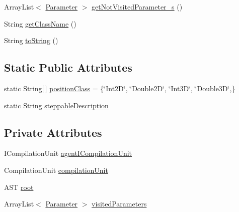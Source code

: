 \begin{DoxyCompactItemize}
\item 
Array\-List$<$ \hyperlink{classit_1_1isislab_1_1masonhelperdocumentation_1_1analizer_1_1_parameter}{Parameter} $>$ \hyperlink{classit_1_1isislab_1_1masonhelperdocumentation_1_1analizer_1_1_agent_analizer_a9fdb36c2a505d7ad2459d70f413216d0}{get\-Not\-Visited\-Parameter\-\_\-s} ()
\item 
String \hyperlink{classit_1_1isislab_1_1masonhelperdocumentation_1_1analizer_1_1_agent_analizer_ace466e16439878a851eb63d5a11ddf43}{get\-Class\-Name} ()
\item 
String \hyperlink{classit_1_1isislab_1_1masonhelperdocumentation_1_1analizer_1_1_agent_analizer_aea58a6f4ec614b3778588784cb250dcb}{to\-String} ()
\end{DoxyCompactItemize}
\subsection*{Static Public Attributes}
\begin{DoxyCompactItemize}
\item 
static String\mbox{[}$\,$\mbox{]} \hyperlink{classit_1_1isislab_1_1masonhelperdocumentation_1_1analizer_1_1_agent_analizer_a9d8e56c5d7ee2102e06e509b301205bb}{position\-Class} = \{\char`\"{}Int2\-D\char`\"{}, \char`\"{}Double2\-D\char`\"{}, \char`\"{}Int3\-D\char`\"{}, \char`\"{}Double3\-D\char`\"{},\}
\item 
static String \hyperlink{classit_1_1isislab_1_1masonhelperdocumentation_1_1analizer_1_1_agent_analizer_ada4b9766b061207045f6b7110e7e8ed6}{steppable\-Description}
\end{DoxyCompactItemize}
\subsection*{Private Attributes}
\begin{DoxyCompactItemize}
\item 
I\-Compilation\-Unit \hyperlink{classit_1_1isislab_1_1masonhelperdocumentation_1_1analizer_1_1_agent_analizer_a5982c48c7c223886875d55c4b2383140}{agent\-I\-Compilation\-Unit}
\item 
Compilation\-Unit \hyperlink{classit_1_1isislab_1_1masonhelperdocumentation_1_1analizer_1_1_agent_analizer_a1fdd2196fdd7b7907ab94da91b8306f4}{compilation\-Unit}
\item 
A\-S\-T \hyperlink{classit_1_1isislab_1_1masonhelperdocumentation_1_1analizer_1_1_agent_analizer_a43035809f1965186296ce39327323a14}{root}
\item 
Array\-List$<$ \hyperlink{classit_1_1isislab_1_1masonhelperdocumentation_1_1analizer_1_1_parameter}{Parameter} $>$ \hyperlink{classit_1_1isislab_1_1masonhelperdocumentation_1_1analizer_1_1_agent_analizer_a631132645fb74a4498f033579556efa9}{visited\-Parameters}
\end{DoxyCompactItemize}
